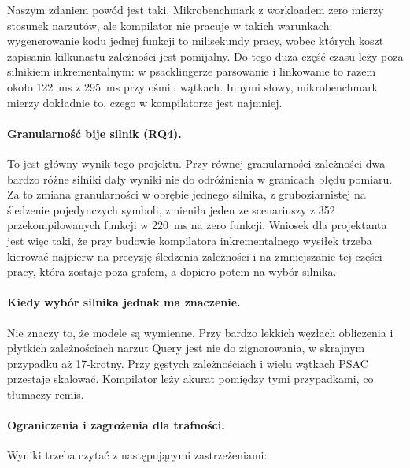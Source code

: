 \documentclass[11pt,a4paper]{article}
\begin{document}
Naszym zdaniem powód jest taki. Mikrobenchmark z workloadem zero mierzy stosunek
narzutów, ale kompilator nie pracuje w takich warunkach: wygenerowanie kodu
jednej funkcji to milisekundy pracy, wobec których koszt zapisania kilkunastu
zależności jest pomijalny. Do tego duża część czasu leży poza silnikiem
inkrementalnym: w psacklingerze parsowanie i linkowanie to razem około 122~ms
z 295~ms przy ośmiu wątkach. Innymi słowy, mikrobenchmark mierzy dokładnie to,
czego w kompilatorze jest najmniej.

\paragraph{Granularność bije silnik (RQ4).} To jest główny wynik tego projektu.
Przy równej granularności zależności dwa bardzo różne silniki dały wyniki nie do
odróżnienia w granicach błędu pomiaru. Za to zmiana granularności w obrębie
jednego silnika, z gruboziarnistej na śledzenie pojedynczych symboli, zmieniła
jeden ze scenariuszy z 352 przekompilowanych funkcji w 220~ms na zero funkcji.
Wniosek dla projektanta jest więc taki, że przy budowie kompilatora
inkrementalnego wysiłek trzeba kierować najpierw na precyzję śledzenia
zależności i na zmniejszanie tej części pracy, która zostaje poza grafem,
a dopiero potem na wybór silnika.

\paragraph{Kiedy wybór silnika jednak ma znaczenie.} Nie znaczy to, że modele są
wymienne. Przy bardzo lekkich węzłach obliczenia i płytkich zależnościach narzut
Query jest nie do zignorowania, w skrajnym przypadku aż 17-krotny. Przy gęstych
zależnościach i wielu wątkach PSAC przestaje skalować. Kompilator leży akurat
pomiędzy tymi przypadkami, co tłumaczy remis.

\paragraph{Ograniczenia i zagrożenia dla trafności.} Wyniki trzeba czytać
z następującymi zastrzeżeniami:
\end{document}
